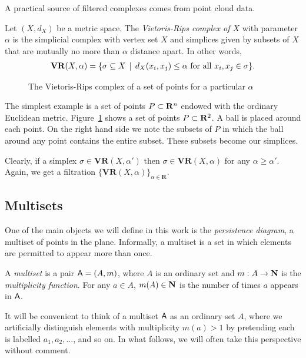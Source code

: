 A practical source of filtered complexes comes from point cloud data.

\begin{definition}
Let $(X, d_X)$ be a metric space. The \emph{Vietoris-Rips complex of $X$} with parameter $\alpha$ is the simplicial complex with vertex set $X$ and simplices given by subsets of $X$ that are mutually no more than $\alpha$ distance apart. In other words,
\begin{align*}
  \mathbf{VR}(X, \alpha) = \{ \sigma \subseteq X \, \mid \, d_X(x_i, x_j) \leq \alpha \text{ for all } x_i, x_j \in \sigma \}.
\end{align*}
\end{definition}


\begin{figure}
\makebox[\linewidth]{

}
\caption{The Vietoris-Rips complex of a set of points for a particular $\alpha$}
\label{fig:vrcomplex}
\end{figure}

\begin{example}
The simplest example is a set of points $P \subset \mathbf{R}^n$ endowed with the ordinary Euclidean metric. Figure~\ref{fig:vrcomplex} shows a set of points $P \subset \mathbf{R}^2$. A ball is placed around each point. On the right hand side we note the subsets of $P$ in which the ball around any point contains the entire subset. These subsets become our simplices. 
\end{example}

Clearly, if a simplex $\sigma \in \mathbf{VR}(X, \alpha')$ then $\sigma \in \mathbf{VR}(X, \alpha)$ for any $\alpha \geq \alpha'$. Again, we get a filtration $\{\mathbf{VR}(X, \alpha)\}_{\alpha \in \mathbf{R}}$.

\subsection{Multisets}

One of the main objects we will define in this work is the \emph{persistence diagram}, a multiset of points in the plane. Informally, a multiset is a set in which elements are permitted to appear more than once.

\begin{definition}
A \emph{multiset} is a pair $\mathsf{A} = (A, m)$, where $A$ is an ordinary set and $m : A \to \mathbf{N}$ is the \emph{multiplicity function}. For any $a \in A$, $m(A) \in \mathbf{N}$ is the number of times $a$ appears in $\mathsf{A}$.
\end{definition}

It will be convenient to think of a multiset $\mathsf{A}$ as an ordinary set $A$, where we artificially distinguish elements with multiplicity $m(a) > 1$ by pretending each is labelled $a_1, a_2, \dots$, and so on. In what follows, we will often take this perspective without comment.